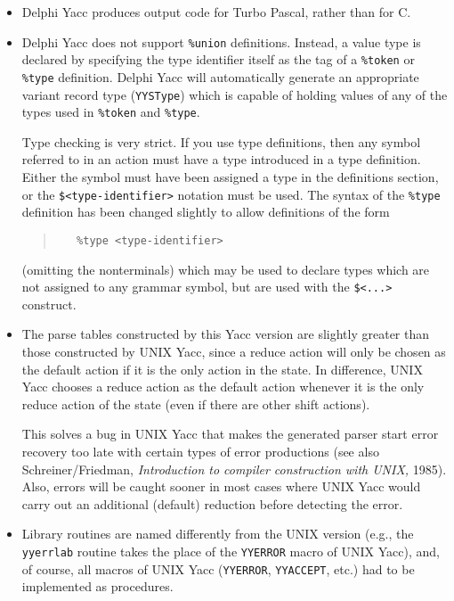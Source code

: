 \documentclass{article}
\begin{document}
\begin{itemize}
   \item
      Delphi Yacc produces output code for Turbo Pascal, rather than for C.
   \item
      Delphi Yacc does not support \verb"%union" definitions. Instead, a value
      type is declared by specifying the type identifier itself as the tag of
      a \verb"%token" or \verb"%type" definition. Delphi Yacc will automatically
      generate an appropriate variant record type (\verb"YYSType") which is
      capable of holding values of any of the types used in \verb"%token" and
      \verb"%type".
    
      Type checking is very strict. If you use type definitions, then
      any symbol referred to in an action must have a type introduced
      in a type definition. Either the symbol must have been assigned a
      type in the definitions section, or the \verb"$<type-identifier>"
      notation must be used. The syntax of the \verb"%type" definition has
      been changed slightly to allow definitions of the form
      \begin{quote}\begin{verbatim}
   %type <type-identifier>
      \end{verbatim}\end{quote}
      (omitting the nonterminals) which may be used to declare types which
      are not assigned to any grammar symbol, but are used with the
      \verb"$<...>" construct.
   \item
      The parse tables constructed by this Yacc version are slightly greater
      than those constructed by UNIX Yacc, since a reduce action will only be
      chosen as the default action if it is the only action in the state.
      In difference, UNIX Yacc chooses a reduce action as the default action
      whenever it is the only reduce action of the state (even if there are
      other shift actions).
    
      This solves a bug in UNIX Yacc that makes the generated parser start
      error recovery too late with certain types of error productions (see
      also Schreiner/Friedman, {\em Introduction to compiler construction with
      UNIX,\/} 1985). Also, errors will be caught sooner in most cases where
      UNIX Yacc would carry out an additional (default) reduction before
      detecting the error.
   \item
      Library routines are named differently from the UNIX version (e.g.,
      the \verb"yyerrlab" routine takes the place of the \verb"YYERROR"
      macro of UNIX Yacc), and, of course, all macros of UNIX Yacc
      (\verb"YYERROR", \verb"YYACCEPT", etc.) had to be implemented as
      procedures.
\end{itemize}
\end{document}
